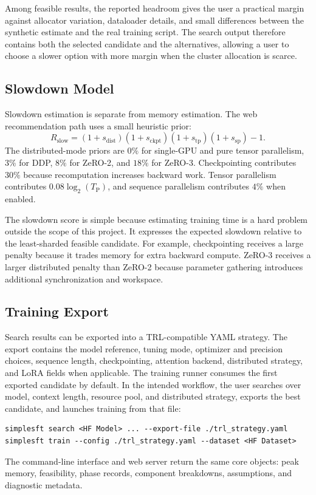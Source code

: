 Among feasible results, the reported headroom gives the user a practical margin against
allocator variation, dataloader details, and small differences between the
synthetic estimate and the real training script. The search output therefore
contains both the selected candidate and the alternatives, allowing a user to
choose a slower option with more margin when the cluster allocation is scarce.

\subsection{Slowdown Model}
Slowdown estimation is separate from memory estimation. The web recommendation
path uses a small heuristic prior:
\[
R_{\mathrm{slow}} =
\left(1 + s_{\mathrm{dist}}\right)
\left(1 + s_{\mathrm{ckpt}}\right)
\left(1 + s_{\mathrm{tp}}\right)
\left(1 + s_{\mathrm{sp}}\right) - 1.
\]
The distributed-mode priors are $0\%$ for single-GPU and pure tensor
parallelism, $3\%$ for DDP, $8\%$ for ZeRO-2, and $18\%$ for ZeRO-3.
Checkpointing contributes $30\%$ because recomputation increases backward
work. Tensor parallelism contributes $0.08\log_2(T_{\mathrm{P}})$, and
sequence parallelism contributes $4\%$ when enabled.

The slowdown score is simple because estimating training time is a hard problem
outside the scope of this project. It expresses the expected slowdown
relative to the least-sharded feasible candidate.
For example, checkpointing receives a large penalty because it trades memory for
extra backward compute. ZeRO-3 receives a larger distributed penalty than
ZeRO-2 because parameter gathering introduces additional synchronization and
workspace.

\subsection{Training Export}
Search results can be exported into a TRL-compatible YAML strategy. The export
contains the model reference, tuning mode, optimizer and precision choices,
sequence length, checkpointing, attention backend, distributed strategy, and
LoRA fields when applicable. The training runner consumes the first exported
candidate by default. In the intended workflow, the user searches over model,
context length, resource pool, and distributed strategy, exports the best
candidate, and launches training from that file:

\begin{verbatim}
simplesft search <HF Model> ... --export-file ./trl_strategy.yaml
simplesft train --config ./trl_strategy.yaml --dataset <HF Dataset>
\end{verbatim}

The command-line interface and web server return the same core objects: peak
memory, feasibility, phase records, component breakdowns, assumptions, and
diagnostic metadata.
